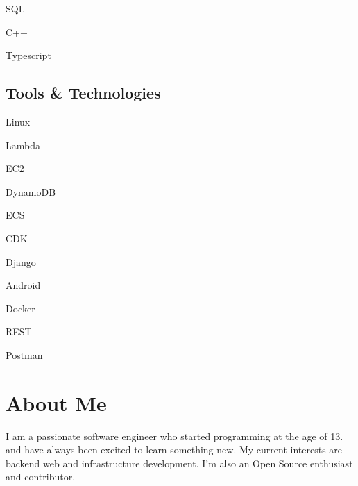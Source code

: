 \documentclass[]{abhijeet_viswa-deedy-resume-openfont}
\begin{document}
\begin{minipage}[t]{0.25\textwidth}
\begin{itemize*}
 \item SQL
 \item C++
 \item Typescript
\end{itemize*}
\subsectionsep

\subsection{Tools \& Technologies}
\begin{itemize*}
 \item Linux
 \item Lambda
 \item EC2
 \item DynamoDB
 \item ECS
 \item CDK
 \item Django
 \item Android
 \item Docker
 \item REST
 \item Postman
\end{itemize*}
\secondarysectionsep


\section{About Me}
\noindent \RaggedRight \normalfont
I am a passionate software engineer who started programming at the age of 13.
and have always been excited to learn something new. My current interests are
backend web and infrastructure development. I'm also an Open Source enthusiast
and contributor.

%
%

\end{minipage}
\end{document}
